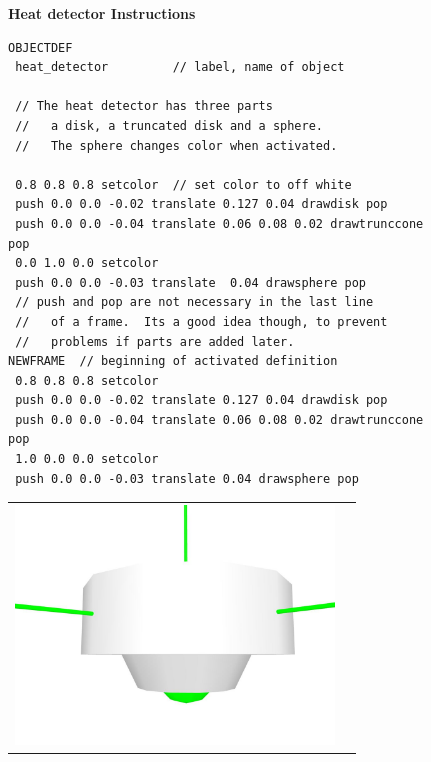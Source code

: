 \documentclass[11pt,twoside]{book}
\newcommand{\figoptions}{hbp}
\newcommand{\figheightA}{2.5in}
\begin{document}
\begin{figure}[\figoptions]
{\bf Heat detector Instructions}\\
{\small
\begin{Verbatim}[frame=single,rulecolor=\color{blue},
framerule=3pt,framesep=1pc,fillcolor=\color{yellow}]
OBJECTDEF
 heat_detector         // label, name of object

 // The heat detector has three parts
 //   a disk, a truncated disk and a sphere.
 //   The sphere changes color when activated.

 0.8 0.8 0.8 setcolor  // set color to off white
 push 0.0 0.0 -0.02 translate 0.127 0.04 drawdisk pop
 push 0.0 0.0 -0.04 translate 0.06 0.08 0.02 drawtrunccone pop
 0.0 1.0 0.0 setcolor
 push 0.0 0.0 -0.03 translate  0.04 drawsphere pop
 // push and pop are not necessary in the last line
 //   of a frame.  Its a good idea though, to prevent
 //   problems if parts are added later.
NEWFRAME  // beginning of activated definition
 0.8 0.8 0.8 setcolor
 push 0.0 0.0 -0.02 translate 0.127 0.04 drawdisk pop
 push 0.0 0.0 -0.04 translate 0.06 0.08 0.02 drawtrunccone pop
 1.0 0.0 0.0 setcolor
 push 0.0 0.0 -0.03 translate 0.04 drawsphere pop
\end{Verbatim}
}
\begin{center}
\begin{tabular}{cc}
 \includegraphics[height=\figheightA]{figures/heatdetector_inact}&

\end{tabular}
\end{center}
\end{figure}
\end{document}
